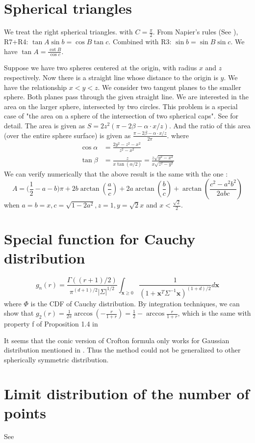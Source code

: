 \documentclass{article}
\begin{document}
\section{Spherical triangles}
We treat the  right spherical triangles. with $C=\frac{\pi}{2}$.
From Napier's rules
(See \cite{Napier}),
R7+R4: $\tan A \sin b = \cos B \tan c$.
Combined with R3: $\sin b = \sin B \sin c$.
We have $\tan A = \frac{\cot B}{\cos c}$.

Suppose we have two spheres centered at the origin, with radius $x$ and $z$ respectively.
Now there is a straight line whose distance to the origin is $y$.
We have the relationship $x<y<z$.
We consider two tangent planes to the smaller sphere.
Both planes pass through the given straight line.
We are interested in the area
on the larger sphere,
intersected by two circles.
This problem is a special case
of "the area on a sphere of the intersection of two spherical caps".
See \cite{intersection}
for detail.
The area is given as $S=2z^2(\pi - 2\beta - \alpha \cdot x/z)$.
And the ratio of this area (over the entire sphere surface)
is given as
$\frac{\pi - 2\beta - \alpha \cdot x/z}{2\pi}$.
where
\begin{align}
\cos \alpha & = \frac{2y^2 - z^2 - x^2}{
    z^2 - x^2 }\\
\tan \beta &= \frac{z}{ 
    x  \tan(\alpha/2)} = \frac{z \sqrt{y^2-x^2}}{x\sqrt{z^2-y^2}}
\end{align}
We can verify numerically that the above result is the same with 
the one \cite{orthogonal}:
\begin{equation}
    A=\big(\frac 12-a-b\big)\pi + 2b\arctan(\frac ac)+2a\arctan(\frac bc)+\arctan(\frac{c^2-a^2 b^2}{2abc})
\end{equation}
when $a=b=x, c=\sqrt{1-2a^2}, z=1,y=\sqrt{2}x$ and $x<\frac{\sqrt{2}}{2}$.
\section{Special function for Cauchy distribution}
\begin{equation}
    g_n(r) = \frac{\Gamma((r+1)/2)}{\pi^{(d+1)/2}|\Sigma|^{1/2}}
    \int_{\bm{x}\geq 0}\frac{1}{(1+\bm{x}^T\Sigma^{-1}\bm{x})^{(1+d)/2}}d\bm{x}
\end{equation}
where $\Phi$ is the CDF of Cauchy distribution.
By integration techniques, we can show that 
$g_2(r)=\frac{1}{2\pi}\arccos(-\frac{r}{1+r})
=\frac{1}{2}-\arccos\frac{r}{1+r}$,
which is the same with property f of Proposition 1.4 in \cite{kabluchko2020absorption}

It seems that the conic version of Crofton formula only
works for Gaussian distribution mentioned in \cite{kabluchko2020absorption}.
Thus the method could not be generalized to
other spherically symmetric distribution.
\section{Limit distribution of the number of points}
See \cite{aldous1991number}



\end{document}
